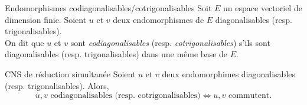 \begin{defi}{Endomorphismes codiagonalisables/cotrigonalisables}
    Soit $E$ un espace vectoriel de dimension finie. Soient $u$ et $v$ deux endomorphismes de $E$ diagonalisables (resp. trigonalisables). \\
    On dit que $u$ et $v$ sont \emph{codiagonalisables} (resp. \emph{cotrigonalisables}) s'ils sont diagonalisables (resp. trigonalisables) dans une même base de $E$.
\end{defi}

\begin{prop}{CNS de réduction simultanée}
    Soient $u$ et $v$ deux endomorphimes diagonalisables (resp. trigonalisables). Alors, 
    $$u, v \text{ codiagonalisables (resp. cotrigonalisables)} \iff u, v \text{ commutent}.$$
\end{prop}

